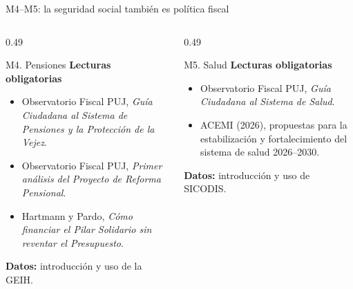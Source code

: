 \documentclass{beamer}
\begin{document}
\begin{frame}{M4--M5: la seguridad social tambi\'en es pol\'itica fiscal}
\scriptsize
\begin{columns}[T,onlytextwidth]
  \begin{column}{0.49\textwidth}
    \begin{block}{M4. Pensiones}
      \textbf{Lecturas obligatorias}
      \begin{itemize}
        \item Observatorio Fiscal PUJ, \textit{Gu\'ia Ciudadana al Sistema de Pensiones y la Protecci\'on de la Vejez}.
        \item Observatorio Fiscal PUJ, \textit{Primer an\'alisis del Proyecto de Reforma Pensional}.
        \item Hartmann y Pardo, \textit{C\'omo financiar el Pilar Solidario sin reventar el Presupuesto}.
      \end{itemize}
      \textbf{Datos:} introducci\'on y uso de la GEIH.
    \end{block}
  \end{column}
  \begin{column}{0.49\textwidth}
    \begin{block}{M5. Salud}
      \textbf{Lecturas obligatorias}
      \begin{itemize}
        \item Observatorio Fiscal PUJ, \textit{Gu\'ia Ciudadana al Sistema de Salud}.
        \item ACEMI (2026), propuestas para la estabilizaci\'on y fortalecimiento del sistema de salud 2026--2030.
      \end{itemize}
      \textbf{Datos:} introducci\'on y uso de SICODIS.
    \end{block}
  \end{column}
\end{columns}
\end{frame}
\end{document}
